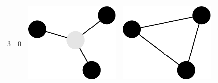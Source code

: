 \begin{figure}
\begin{tabular}{cccc}
\midrule
$3$ & $0$ & \includegraphics[height=0.04\textheight]{Grafica/el-E} & \includegraphics[height=0.04\textheight]{Grafica/el-F}\\
\midrule

\end{tabular}
\end{figure}
